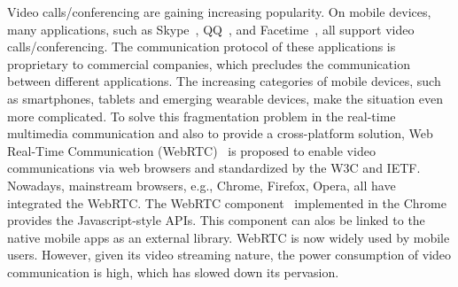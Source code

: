 Video calls/conferencing are gaining increasing popularity.  On mobile
devices, many applications, such as Skype~\cite{skype}, QQ~\cite{qq},
and Facetime~\cite{facetime}, all support video
calls/conferencing. The communication protocol of these applications
is proprietary to commercial companies, which precludes the
communication between different applications.  The increasing
categories of mobile devices, such as smartphones, tablets and
emerging wearable devices, make the situation even more
complicated. To solve this fragmentation problem in the real-time
multimedia communication and also to provide a cross-platform
solution, Web Real-Time Communication (WebRTC)~\cite{webrtcstandard}
is proposed to enable video communications via web browsers and
standardized by the W3C and IETF. Nowadays, mainstream browsers, e.g.,
Chrome, Firefox, Opera, all have integrated the WebRTC. The WebRTC
component~\cite{webrtcproject} implemented in the Chrome provides the
Javascript-style APIs. This component can alos be linked to the native
mobile apps as an external library.  WebRTC is now widely used by
mobile users. However, given its video streaming nature, the power
consumption of video communication is high, which has slowed down its
pervasion.






